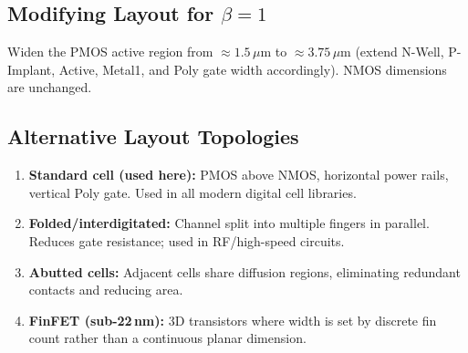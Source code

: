 \documentclass[12pt, a4paper]{article}
\begin{document}
\subsection{Modifying Layout for $\beta = 1$}

Widen the PMOS active region from $\approx 1.5\,\mu$m to $\approx 3.75\,\mu$m (extend N-Well, P-Implant, Active, Metal1, and Poly gate width accordingly). NMOS dimensions are unchanged.

\subsection{Alternative Layout Topologies}

\begin{enumerate}
    \item \textbf{Standard cell (used here):} PMOS above NMOS, horizontal power rails, vertical Poly gate. Used in all modern digital cell libraries.
    \item \textbf{Folded/interdigitated:} Channel split into multiple fingers in parallel. Reduces gate resistance; used in RF/high-speed circuits.
    \item \textbf{Abutted cells:} Adjacent cells share diffusion regions, eliminating redundant contacts and reducing area.
    \item \textbf{FinFET (sub-22\,nm):} 3D transistors where width is set by discrete fin count rather than a continuous planar dimension.
\end{enumerate}
\end{document}
